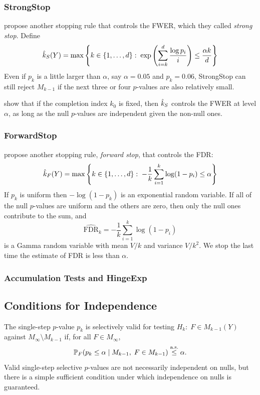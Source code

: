 \documentclass{article}
\begin{document}
\subsubsection{StrongStop}

\citet{gsell2013sequential} propose another stopping rule that controls the FWER, which they called {\em strong stop}. Define
\[
  \hat{k}_{S}(Y) = \max\left\{k \in \{1,\ldots,d\} :\;
    \exp\left(\sum_{i=k}^d \frac{\log p_i}{i}\right) 
    \leq \frac{\alpha k}{d}\right\}
\]
Even if $p_k$ is a little larger than $\alpha$, say $\alpha=0.05$ and $p_k=0.06$, StrongStop can still reject $M_{k-1}$ if the next three or four $p$-values are also relatively small.

\citet{gsell2013sequential} show that if the completion index $k_0$ is fixed, then $\hat{k}_S$ controls the FWER at level $\alpha$, as long as the null $p$-values are independent given the non-null ones.

\subsubsection{ForwardStop}

\citet{gsell2013sequential} propose another stopping rule, {\em forward stop}, that controls the FDR:
\[
  \hat{k}_{F}(Y) = \max\left\{k \in \{1,\ldots,d\} :\;
    -\frac{1}{k}\sum_{i=1}^k \log(1-p_i) \leq \alpha\right\}
\]
If $p_k$ is uniform then  $-\log(1-p_k)$ is an exponential random variable. If all of the null $p$-values are uniform and the others are zero, then only the null ones contribute to the sum, and
\[
\widehat{\text{FDR}}_k = -\frac{1}{k}\sum_{i=1}^k \log(1-p_i)
\]
is a Gamma random variable with mean $V/k$ and variance $V/k^2$. We stop the last time the estimate of FDR is less than $\alpha$. 

\subsubsection{Accumulation Tests and HingeExp}


\subsection{Conditions for Independence}\label{sec:pValsIndep}

The single-step $p$-value $p_k$ is selectively valid for testing $H_k:\; F \in M_{k-1}(Y)$ against $M_\infty \setminus M_{k-1}$ if, for all $F\in M_\infty$,
\[
\mathbb{P}_F(p_k \leq \alpha \mid M_{k-1},\; F\in M_{k-1}) \overset{\textrm{a.s.}}{\leq} \alpha.
\]
Valid single-step selective $p$-values are not necessarily independent on nulls, but there is a simple sufficient condition under which independence on nulls is guaranteed.
\end{document}
